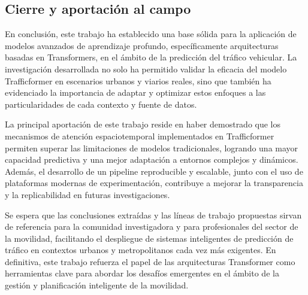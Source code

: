\subsection{Cierre y aportación al campo}
\label{sec:cierre_aport}

En conclusión, este trabajo ha establecido una base sólida para la aplicación de modelos avanzados de aprendizaje profundo, específicamente arquitecturas basadas en Transformers, en el ámbito de la predicción del tráfico vehicular. La investigación desarrollada no solo ha permitido validar la eficacia del modelo Trafficformer en escenarios urbanos y viarios reales, sino que también ha evidenciado la importancia de adaptar y optimizar estos enfoques a las particularidades de cada contexto y fuente de datos.

La principal aportación de este trabajo reside en haber demostrado que los mecanismos de atención espaciotemporal implementados en Trafficformer permiten superar las limitaciones de modelos tradicionales, logrando una mayor capacidad predictiva y una mejor adaptación a entornos complejos y dinámicos. Además, el desarrollo de un pipeline reproducible y escalable, junto con el uso de plataformas modernas de experimentación, contribuye a mejorar la transparencia y la replicabilidad en futuras investigaciones.

Se espera que las conclusiones extraídas y las líneas de trabajo propuestas sirvan de referencia para la comunidad investigadora y para profesionales del sector de la movilidad, facilitando el despliegue de sistemas inteligentes de predicción de tráfico en contextos urbanos y metropolitanos cada vez más exigentes. En definitiva, este trabajo refuerza el papel de las arquitecturas Transformer como herramientas clave para abordar los desafíos emergentes en el ámbito de la gestión y planificación inteligente de la movilidad.



